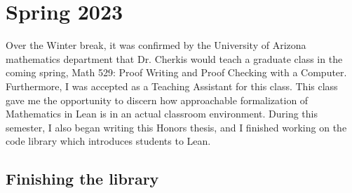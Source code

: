 \section{Spring 2023}

Over the Winter break, it was confirmed by the University of Arizona
mathematics department that Dr. Cherkis would teach a graduate class
in the coming spring, Math 529: Proof Writing and Proof Checking with
a Computer. Furthermore, I was accepted as a Teaching Assistant for
this class. This class gave me the opportunity to discern how 
approachable formalization of Mathematics in Lean is in an actual
classroom environment. During this semester, I also began writing 
this Honors thesis, and I finished working on the code library
which introduces students to Lean. 

\subsection{Finishing the library}


